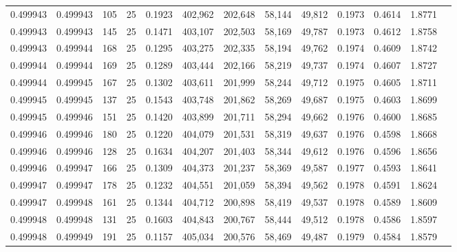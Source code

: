 \begin{tabular}{rrrrrrrrrrrrr}
0.499943 & 0.499943 & 105 &  25 &                                     0.1923 & 402,962 & 202,648 &  58,144 &  49,812 & 0.1973 & 0.4614 & 1.8771 \\
0.499943 & 0.499943 & 145 &  25 &                                     0.1471 & 403,107 & 202,503 &  58,169 &  49,787 & 0.1973 & 0.4612 & 1.8758 \\
0.499943 & 0.499944 & 168 &  25 &                                     0.1295 & 403,275 & 202,335 &  58,194 &  49,762 & 0.1974 & 0.4609 & 1.8742 \\
0.499944 & 0.499944 & 169 &  25 &                                     0.1289 & 403,444 & 202,166 &  58,219 &  49,737 & 0.1974 & 0.4607 & 1.8727 \\
0.499944 & 0.499945 & 167 &  25 &                                     0.1302 & 403,611 & 201,999 &  58,244 &  49,712 & 0.1975 & 0.4605 & 1.8711 \\
0.499945 & 0.499945 & 137 &  25 &                                     0.1543 & 403,748 & 201,862 &  58,269 &  49,687 & 0.1975 & 0.4603 & 1.8699 \\
0.499945 & 0.499946 & 151 &  25 &                                     0.1420 & 403,899 & 201,711 &  58,294 &  49,662 & 0.1976 & 0.4600 & 1.8685 \\
0.499946 & 0.499946 & 180 &  25 &                                     0.1220 & 404,079 & 201,531 &  58,319 &  49,637 & 0.1976 & 0.4598 & 1.8668 \\
0.499946 & 0.499946 & 128 &  25 &                                     0.1634 & 404,207 & 201,403 &  58,344 &  49,612 & 0.1976 & 0.4596 & 1.8656 \\
0.499946 & 0.499947 & 166 &  25 &                                     0.1309 & 404,373 & 201,237 &  58,369 &  49,587 & 0.1977 & 0.4593 & 1.8641 \\
0.499947 & 0.499947 & 178 &  25 &                                     0.1232 & 404,551 & 201,059 &  58,394 &  49,562 & 0.1978 & 0.4591 & 1.8624 \\
0.499947 & 0.499948 & 161 &  25 &                                     0.1344 & 404,712 & 200,898 &  58,419 &  49,537 & 0.1978 & 0.4589 & 1.8609 \\
0.499948 & 0.499948 & 131 &  25 &                                     0.1603 & 404,843 & 200,767 &  58,444 &  49,512 & 0.1978 & 0.4586 & 1.8597 \\
0.499948 & 0.499949 & 191 &  25 &                                     0.1157 & 405,034 & 200,576 &  58,469 &  49,487 & 0.1979 & 0.4584 & 1.8579 \\

\end{tabular}
